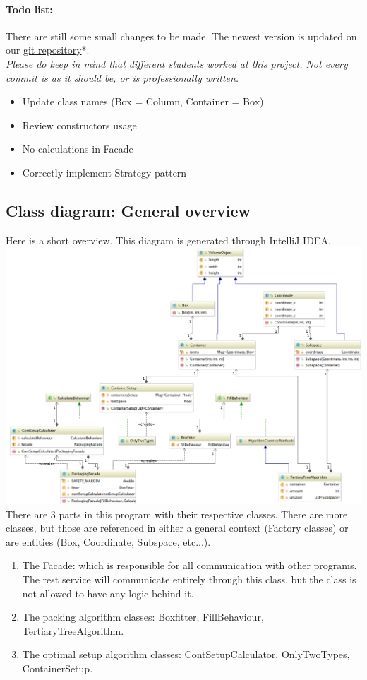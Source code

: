 \documentclass[a4paper,12pt]{article}
\begin{document}
\paragraph{Todo list:} 
There are still some small changes to be made. The newest version is updated on our \hyperref{https://git.iswleuven.be/erowan/3d_bin_packing}{}{}{git repository}*.\\
\small \textit{Please do keep in mind that different students worked at this project. Not every commit is as it should be, or is professionally written.}
\begin{itemize}
	\item[] \xmark \space Update class names (Box = Column, Container = Box)
	\item[] \xmark \space Review constructors usage
	\item[] \xmark \space No calculations in Facade
	\item[] \xmark \space Correctly implement Strategy pattern
\end{itemize}
\pagebreak

\subsection{Class diagram: General overview}
Here is a short overview. This diagram is generated through IntelliJ IDEA.\\

\includegraphics[width=17cm]{Class_diagram_overview.png}\\

There are 3 parts in this program with their respective classes. There are more classes, but those are referenced in either a general context (Factory classes) or are entities (Box, Coordinate, Subspace, etc...). 
\begin{enumerate}
	\item The Facade: which is responsible for all communication with other programs. The rest service will communicate entirely through this class, but the class is not allowed to have any logic behind it.
	\item The packing algorithm classes: Boxfitter, FillBehaviour, TertiaryTreeAlgorithm.
	\item The optimal setup algorithm classes: ContSetupCalculator, OnlyTwoTypes, ContainerSetup.
\end{enumerate}
\end{document}
